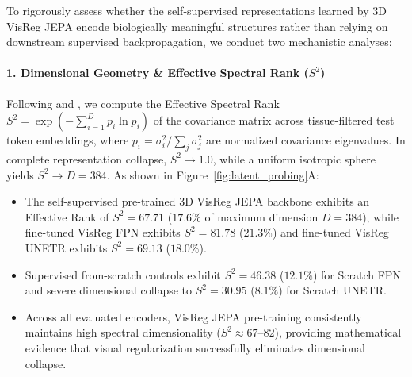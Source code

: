 \documentclass{article}
\begin{document}
To rigorously assess whether the self-supervised representations learned by 3D VisReg JEPA encode biologically meaningful structures rather than relying on downstream supervised backpropagation, we conduct two mechanistic analyses:

\paragraph{1. Dimensional Geometry \& Effective Spectral Rank ($S^2$)}
Following \citet{roy2007effective} and \citet{wu2026visreg}, we compute the Effective Spectral Rank $S^2 = \exp(-\sum_{i=1}^D p_i \ln p_i)$ of the covariance matrix across tissue-filtered test token embeddings, where $p_i = \sigma_i^2 / \sum_j \sigma_j^2$ are normalized covariance eigenvalues. In complete representation collapse, $S^2 \to 1.0$, while a uniform isotropic sphere yields $S^2 \to D = 384$.
As shown in Figure~\ref{fig:latent_probing}A:
\begin{itemize}
    \item The self-supervised pre-trained 3D VisReg JEPA backbone exhibits an Effective Rank of $S^2 = 67.71$ ($17.6\%$ of maximum dimension $D=384$), while fine-tuned VisReg FPN exhibits $S^2 = 81.78$ ($21.3\%$) and fine-tuned VisReg UNETR exhibits $S^2 = 69.13$ ($18.0\%$).
    \item Supervised from-scratch controls exhibit $S^2 = 46.38$ ($12.1\%$) for Scratch FPN and severe dimensional collapse to $S^2 = 30.95$ ($8.1\%$) for Scratch UNETR.
    \item Across all evaluated encoders, VisReg JEPA pre-training consistently maintains high spectral dimensionality ($S^2 \approx 67\text{--}82$), providing mathematical evidence that visual regularization successfully eliminates dimensional collapse.
\end{itemize}
\end{document}
